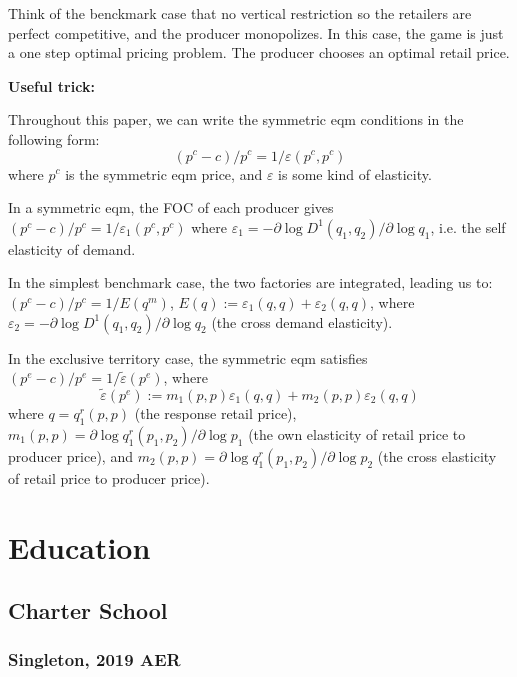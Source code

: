 \documentclass{book}
\theoremstyle{plain}
\theoremstyle{definition}
\begin{document}
Think of the benckmark case that no vertical restriction so the retailers are perfect competitive, and the producer monopolizes. In this case, the game is just a one step optimal pricing problem. The producer chooses an optimal retail price.\\

\begin{mdframed}[style=comment]

\noindent
\textbf{Useful trick:}

Throughout this paper, we can write the symmetric eqm conditions in the following form:
\[(p^c - c)/p^c=1/\varepsilon(p^c,p^c)\]
where $p^c$ is the symmetric eqm price, and $\varepsilon$ is some kind of elasticity.

In a symmetric eqm, the FOC of each producer gives 
\((p^c - c)/p^c=1/\varepsilon_1(p^c,p^c)\)
where $\varepsilon_1 = -\partial \log D^1(q_1,q_2)/\partial \log q_1$, i.e. the self elasticity of demand.

In the simplest benchmark case, the two factories are integrated, leading us to:
\((p^c - c)/p^c=1/E(q^m)\),
$E(q):=\varepsilon_1(q,q)+\varepsilon_2(q,q)$, where $\varepsilon_2 = -\partial \log D^1(q_1,q_2)/\partial \log q_2$ (the cross demand elasticity).

In the exclusive territory case, the symmetric eqm satisfies \((p^e - c)/p^e=1/\tilde\varepsilon(p^e)\), where 
\[\tilde\varepsilon(p^e):=m_1(p,p)\varepsilon_1(q,q)+m_2(p,p)\varepsilon_2(q,q) \]
where $q=q_1^r(p,p)$ (the response retail price),
$m_1(p,p)=\partial \log q_1^r(p_1,p_2)/\partial \log p_1$ (the own elasticity of retail price to producer price),
and  $m_2(p,p)=\partial \log q_1^r(p_1,p_2)/\partial \log p_2$ (the cross elasticity of retail price to producer price).

\end{mdframed}



\part{Education} %
\label{prt:education_}

\chapter{Charter School} %
\label{sec:charter_school}

\section{Singleton, 2019 AER} %
\label{sec:singleton_2019_aer}
\end{document}
